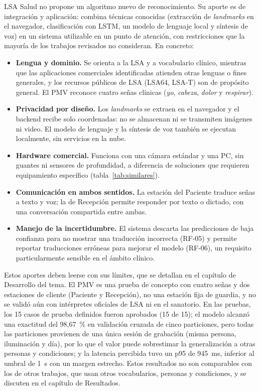 LSA Salud no propone un algoritmo nuevo de reconocimiento. Su aporte es de integración y aplicación: combina técnicas conocidas (extracción de \emph{landmarks} en el navegador, clasificación con LSTM, un modelo de lenguaje local y síntesis de voz) en un sistema utilizable en un punto de atención, con restricciones que la mayoría de los trabajos revisados no consideran. En concreto:
\begin{itemize}
  \item \textbf{Lengua y dominio.} Se orienta a la LSA y a vocabulario clínico, mientras que las aplicaciones comerciales identificadas atienden otras lenguas o fines generales, y los recursos públicos de LSA (LSA64, LSA-T) son de propósito general. El PMV reconoce cuatro señas clínicas (\emph{yo}, \emph{cabeza}, \emph{dolor} y \emph{respirar}).
  \item \textbf{Privacidad por diseño.} Los \emph{landmarks} se extraen en el navegador y el backend recibe solo coordenadas: no se almacenan ni se transmiten imágenes ni video. El modelo de lenguaje y la síntesis de voz también se ejecutan localmente, sin servicios en la nube.
  \item \textbf{Hardware comercial.} Funciona con una cámara estándar y una PC, sin guantes ni sensores de profundidad, a diferencia de soluciones que requieren equipamiento específico (tabla~\ref{tab:similares}).
  \item \textbf{Comunicación en ambos sentidos.} La estación del Paciente traduce señas a texto y voz; la de Recepción permite responder por texto o dictado, con una conversación compartida entre ambas.
  \item \textbf{Manejo de la incertidumbre.} El sistema descarta las predicciones de baja confianza para no mostrar una traducción incorrecta (RF-05) y permite reportar traducciones erróneas para mejorar el modelo (RF-06), un requisito particularmente sensible en el ámbito clínico.
\end{itemize}

Estos aportes deben leerse con sus límites, que se detallan en el capítulo de Desarrollo del tema. El PMV es una prueba de concepto con cuatro señas y dos estaciones de cliente (Paciente y Recepción), no una estación fija de guardia, y no se validó aún con intérpretes oficiales de LSA ni en el sanatorio. En las pruebas, los 15 casos de prueba definidos fueron aprobados (15 de 15); el modelo alcanzó una exactitud del 98,67~\% en validación cruzada de cinco particiones, pero todas las particiones provienen de una única sesión de grabación (misma persona, iluminación y día), por lo que el valor puede sobrestimar la generalización a otras personas y condiciones; y la latencia percibida tuvo un p95 de 945~ms, inferior al umbral de 1~s con un margen estrecho. Estos resultados no son comparables con los de otros trabajos, que usan otros vocabularios, personas y condiciones, y se discuten en el capítulo de Resultados.

